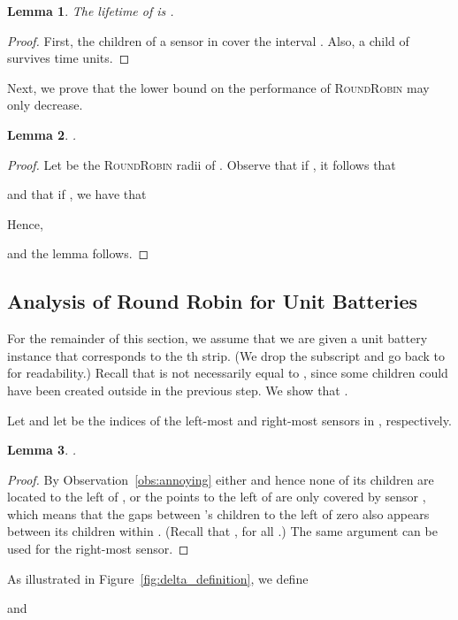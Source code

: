 \documentclass[11pt]{article}
\newtheorem{lemma}{Lemma}
\newcommand{\rr}{\textsc{RoundRobin}\xspace}
\begin{document}
\begin{lemma}
\label{lemma:unit-sol}
The lifetime of  is .
\end{lemma}
\begin{proof}
First, the  children of a sensor  in  cover the
interval .  Also, a child  of
 survives  time units.
\end{proof}

Next, we prove that the lower bound on the performance of \rr may only
decrease.

\begin{lemma}
\label{lemma:unit-convex}
.
\end{lemma}
\begin{proof}
Let  be the \rr radii of .
Observe that if , it follows that

and that if , we have that

Hence, 

and the lemma follows.
\end{proof}




\subsection{Analysis of Round Robin for Unit Batteries}

For the remainder of this section, we assume that we are given a unit
battery instance  that corresponds to the th strip.  (We drop
the subscript  and go back to  for readability.)  Recall that  is not necessarily equal to , since some children 
could have been created outside  in the previous step.  We show
that .

Let  and let  be the indices of the left-most and right-most sensors in
, respectively.  

\begin{lemma}
\label{lemma:Delta}
.
\end{lemma}
\begin{proof}
By Observation~\ref{obs:annoying} either  and hence none
of its children are located to the left of , or the points to the
left of  are only covered by sensor , which means that
the gaps between 's children to the left of zero also appears
between its children within .  (Recall that , for
all .)  The same argument can be used for the right-most sensor.
\end{proof}

As illustrated in Figure~\ref{fig:delta_definition}, we define


and
\end{document}
